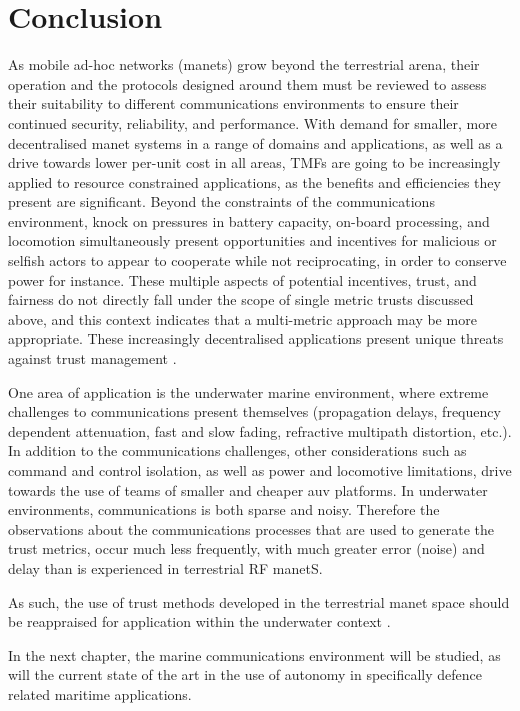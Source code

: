 \section{Conclusion}
As mobile ad-hoc networks (\gls{manet}s) grow beyond the terrestrial arena, their operation and the protocols designed around them must be reviewed to assess their suitability to different communications environments to ensure their continued security, reliability, and performance.
With demand for smaller, more decentralised \gls{manet} systems in a range of domains and applications, as well as a drive towards lower per-unit cost in all areas, TMFs are going to be increasingly applied to resource constrained applications, as the benefits and efficiencies they present are significant.
Beyond the constraints of the communications environment, knock on pressures in battery capacity, on-board processing, and locomotion simultaneously present opportunities and incentives for malicious or selfish actors to appear to cooperate while not reciprocating, in order to conserve power for instance.
These multiple aspects of potential incentives, trust, and fairness do not directly fall under the scope of single metric trusts discussed above, and this context indicates that a multi-metric approach may be more appropriate.
These increasingly decentralised applications present unique threats against trust management \cite{Caiti2011}.

One area of application is the underwater marine environment, where extreme challenges to communications present themselves (propagation delays, frequency dependent attenuation, fast and slow fading, refractive multipath distortion, etc.).
In addition to the communications challenges, other considerations such as command and control isolation, as well as power and locomotive limitations, drive towards the use of teams of smaller and cheaper \acrfull{auv} platforms.
In underwater environments, communications is both sparse and noisy.
Therefore the observations about the communications processes that are used to generate the trust metrics, occur much less frequently, with much greater error (noise) and delay than is experienced in terrestrial RF \gls{manet}S.

As such, the use of trust methods developed in the terrestrial \gls{manet} space should be reappraised for application within the underwater context \cite{Pavan2015}.

In the next chapter, the marine communications environment will be studied, as will the current state of the art in the use of autonomy in specifically defence related maritime applications.
\ifx\ifthesis\undefined

\else
\fi
